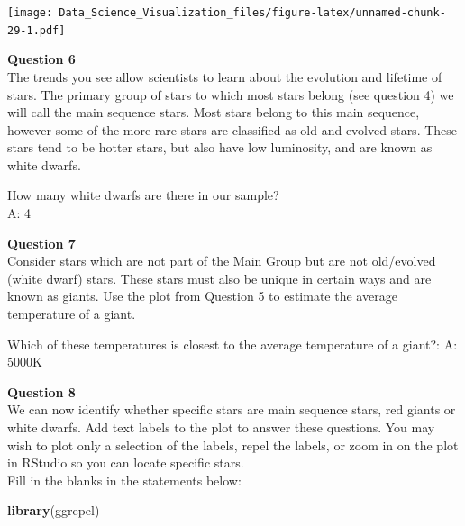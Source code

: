 \documentclass[
]{article}
\newenvironment{Shaded}{\begin{snugshade}}{\end{snugshade}}
\newcommand{\DataTypeTok}[1]{\textcolor[rgb]{0.13,0.29,0.53}{#1}}
\newcommand{\KeywordTok}[1]{\textcolor[rgb]{0.13,0.29,0.53}{\textbf{#1}}}
\newcommand{\NormalTok}[1]{#1}
\newcommand{\OperatorTok}[1]{\textcolor[rgb]{0.81,0.36,0.00}{\textbf{#1}}}
\newcommand{\StringTok}[1]{\textcolor[rgb]{0.31,0.60,0.02}{#1}}
\begin{document}
\begin{Shaded}
\end{Shaded}

\texttt{[image: Data\_Science\_Visualization\_files/figure-latex/unnamed-chunk-29-1.pdf]}

\textbf{Question 6}\\
The trends you see allow scientists to learn about the evolution and
lifetime of stars. The primary group of stars to which most stars belong
(see question 4) we will call the main sequence stars. Most stars belong
to this main sequence, however some of the more rare stars are
classified as old and evolved stars. These stars tend to be hotter
stars, but also have low luminosity, and are known as white dwarfs.

How many white dwarfs are there in our sample?\\
A: 4

\textbf{Question 7}\\
Consider stars which are not part of the Main Group but are not
old/evolved (white dwarf) stars. These stars must also be unique in
certain ways and are known as giants. Use the plot from Question 5 to
estimate the average temperature of a giant.

Which of these temperatures is closest to the average temperature of a
giant?: A: 5000K

\textbf{Question 8}\\
We can now identify whether specific stars are main sequence stars, red
giants or white dwarfs. Add text labels to the plot to answer these
questions. You may wish to plot only a selection of the labels, repel
the labels, or zoom in on the plot in RStudio so you can locate specific
stars.\\
Fill in the blanks in the statements below:

\begin{Shaded}
\begin{Highlighting}[]
\KeywordTok{library}\NormalTok{(ggrepel)}
\end{Highlighting}
\end{Shaded}
\end{document}
